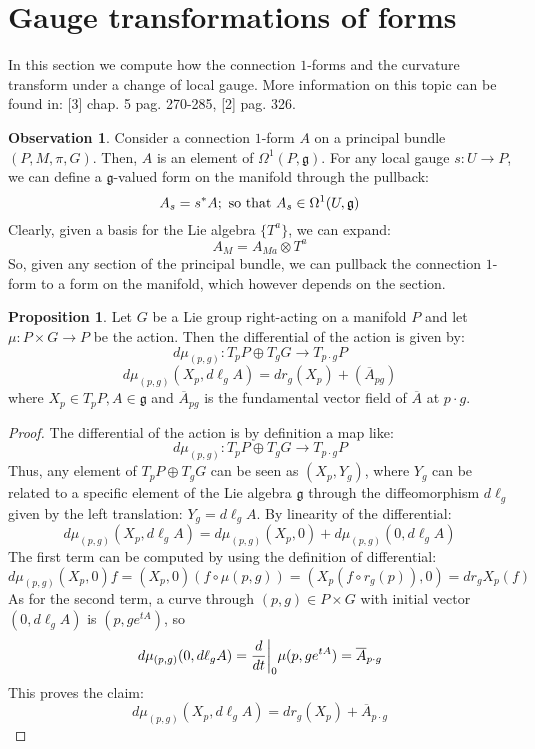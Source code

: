 \documentclass[12pt,a4paper]{report}
\theoremstyle{definition}
\theoremstyle{Theorem}
\newtheorem{Prop}[Def]{Proposition}
\theoremstyle{definition}
\theoremstyle{definition}
\newtheorem{Obs}[Def]{Observation}
\begin{document}
	\section{Gauge transformations of forms}
	In this section we compute how the connection $1$-forms and the curvature transform under a change of local gauge. More information on this topic can be found in: [3] chap. 5 pag. 270-285, [2] pag. 326.
	\begin{Obs}
		Consider a connection $1$-form $A$ on a principal bundle $(P,M,\pi,G)$. Then, $A$ is an element of $\Omega^1(P,\mathfrak{g})$. For any local gauge $s:U\rightarrow P$, we can define a $\mathfrak{g}$-valued form on the manifold through the pullback:
		$$A_s=s^*A;\hbox{ so that }A_s\in \Omega^1(U,\mathfrak{g})$$
		Clearly, given a basis for the Lie algebra $\{T^a\}$, we can expand:
		$$A_M=A_{Ma}\otimes T^a$$
		So, given any section of the principal bundle, we can pullback the connection $1$-form to a form on the manifold, which however depends on the section.
	\end{Obs}
	\begin{Prop}\label{Prop_7.2.1}
		Let $G$ be a Lie group right-acting on a manifold $P$ and let $\mu:P\times G\rightarrow P$ be the action. Then the differential of the action is given by:
		$$d\mu_{(p,g)}:T_pP\oplus T_gG\rightarrow T_{p\cdot g}P$$
		$$d\mu_{(p,g)}(X_p,d\ell_gA)=dr_g(X_p)+(\overline{A}_{pg})$$
		where $X_p\in T_pP,A\in\mathfrak{g}$ and $\overline{A}_{pg}$ is the fundamental vector field of $\overline{A}$ at $p\cdot g$.
	\end{Prop}
	\begin{proof}
		The differential of the action is by definition a map like:
		$$d\mu_{(p,g)}:T_pP\oplus T_gG\rightarrow T_{p\cdot g}P$$
		Thus, any element of $T_pP\oplus T_gG$ can be seen as $(X_p,Y_g)$, where $Y_g$ can be related to a specific element of the Lie algebra $\mathfrak{g}$ through the diffeomorphism $d\ell_g$ given by the left translation: $Y_g=d\ell_gA$.
		By linearity of the differential:
		$$d\mu_{(p,g)}(X_p,d\ell_gA)=d\mu_{(p,g)}(X_p,0)+d\mu_{(p,g)}(0,d\ell_gA)$$
		The first term can be computed by using the definition of differential:
		$$d\mu_{(p,g)}(X_p,0)f=(X_p,0)(f\circ \mu(p,g))=(X_p(f\circ r_g(p)),0)=dr_gX_p(f)$$
		As for the second term, a curve through $(p,g)\in P\times G$ with initial vector $(0,d\ell_g A)$ is $(p,ge^{tA})$, so
		$$d\mu_{(p,g)}(0,d\ell_gA)={d\over dt}\bigg|_0\mu(p,ge^{tA})=\overline{A}_{p\cdot g}$$
		This proves the claim:
		$$d\mu_{(p,g)}(X_p,d\ell_gA)=dr_g(X_p)+\overline{A}_{p\cdot g}$$%
	\end{proof}
\end{document}

